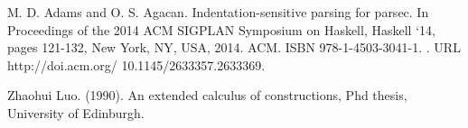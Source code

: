 \begin{thebibliography}{99}


 M. D. Adams and O. S. Agacan. Indentation-sensitive
  parsing for parsec. In Proceedings of the 2014 ACM SIGPLAN Symposium on
  Haskell, Haskell `14, pages 121-132, New York, NY, USA, 2014.  ACM. ISBN
  978-1-4503-3041-1. . URL http://doi.acm.org/ 10.1145/2633357.2633369.


 Zhaohui Luo. (1990). An extended calculus of constructions,
  Phd thesis, University of Edinburgh.

\end{thebibliography}


